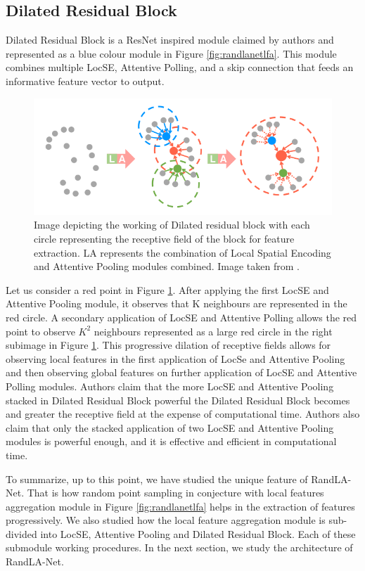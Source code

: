 \subsection{Dilated Residual Block}
Dilated Residual Block is a ResNet inspired module claimed by authors and represented as a blue colour module in Figure \ref{fig:randlanetlfa}.
This module combines multiple LocSE, Attentive Polling, and a skip connection that feeds an informative feature vector to output.
\begin{figure}
    \centering
    \includegraphics[scale=0.5]{images/dilatedresidualblock.png}
    \caption{Image depicting the working of Dilated residual block with each circle representing the receptive field of the block for feature extraction. LA represents the combination of Local Spatial Encoding and Attentive Pooling modules combined. Image taken from \cite{Hu_2020_CVPR_Randla}.}
    \label{fig:dilatedresidualblock}
\end{figure}
Let us consider a red point in Figure \ref{fig:dilatedresidualblock}. After applying the first LocSE and Attentive Pooling module, it observes that K neighbours are represented in the red circle.
A secondary application of LocSE and Attentive Polling allows the red point to observe $K^{2}$ neighbours represented as a large red circle in the right subimage in Figure \ref{fig:dilatedresidualblock}.
This progressive dilation of receptive fields allows for observing local features in the first application of LocSe and Attentive Pooling and then observing global features on further application of LocSE and Attentive Polling modules.
Authors claim that the more LocSE and Attentive Pooling stacked in Dilated Residual Block powerful the Dilated Residual Block becomes and greater the receptive field at the expense of computational time.
Authors also claim that only the stacked application of two LocSE and Attentive Pooling modules is powerful enough, and it is effective and efficient in computational time.

To summarize, up to this point, we have studied the unique feature of RandLA-Net. That is how random point sampling in conjecture with local features aggregation module in Figure \ref{fig:randlanetlfa} helps in the extraction of features progressively.
We also studied how the local feature aggregation module is sub-divided into LocSE, Attentive Pooling and Dilated Residual Block. Each of these submodule working procedures.
In the next section, we study the architecture of RandLA-Net.

